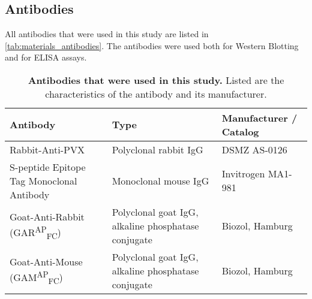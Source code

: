 \subsection{Antibodies}
All antibodies that were used in this study are listed in \autoref{tab:materials_antibodies}. The antibodies were used both for Western Blotting and for ELISA assays. 
\begin{table}[h]
    \centering
    \caption{\textbf{Antibodies that were used in this study.} Listed are the characteristics of the antibody and its manufacturer. }
    \begin{tabular}{lll}
    \toprule
    \textbf{Antibody} & \textbf{Type} & \textbf{Manufacturer / Catalog} \\
    \midrule
    Rabbit-Anti-PVX & Polyclonal rabbit IgG & DSMZ AS-0126 \\
    S-peptide Epitope Tag Monoclonal Antibody & Monoclonal mouse IgG & Invitrogen MA1-981 \\
    Goat-Anti-Rabbit (GAR\textsuperscript{AP}\textsubscript{FC}) & Polyclonal goat IgG, alkaline phosphatase conjugate & Biozol, Hamburg \\
    Goat-Anti-Mouse (GAM\textsuperscript{AP}\textsubscript{FC}) & Polyclonal goat IgG, alkaline phosphatase conjugate & Biozol, Hamburg \\
    \bottomrule
    \end{tabular}
    \label{tab:materials_antibodies}
\end{table}
\FloatBarrier
